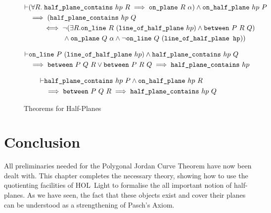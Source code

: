 \begin{figure}
  \begin{equation}\label{eq:onHalfPlaneNotBet}
    \begin{split}
      \vdash&(\forall R.\; \texttt{half\_plane\_contains}\ hp\ R \implies \texttt{on\_plane}\ R\ \alpha) \wedge \texttt{on\_half\_plane}\ hp\ P\\
      &\implies (\texttt{half\_plane\_contains}\ hp\ Q\\
      &\qquad \iff \neg(\exists R. \texttt{on\_line}\ R\ (\texttt{line\_of\_half\_plane}\ hp) \wedge \texttt{between}\ P\ R\ Q)\\
      &\qquad\qquad\quad \wedge \texttt{on\_plane}\ Q\ \alpha \wedge \neg\texttt{on\_line}\ Q\ (\texttt{line\_of\_half\_plane hp}))
    \end{split}
  \end{equation}
  
  \begin{equation}\label{eq:betOnHalfPlane1}
    \begin{split}
      \vdash&\texttt{on\_line}\ P\ (\texttt{line\_of\_half\_plane}\ hp) \wedge \texttt{half\_plane\_contains}\ hp\ Q\\
      &\implies \texttt{between}\ P\ Q\ R \vee \texttt{between}\ P\ R\ Q \implies \texttt{half\_plane\_contains}\ hp
    \end{split}
  \end{equation}
  
  \begin{equation}\label{eq:betOnHalfPlane2}
    \begin{split}
      \vdash&\texttt{half\_plane\_contains}\ hp\ P \wedge \texttt{on\_half\_plane}\ hp\ R\\
      &\implies \texttt{between}\ P\ Q\ R \implies \texttt{half\_plane\_contains}\ hp\ Q
    \end{split}
  \end{equation}
\caption{Theorems for Half-Planes}
\label{fig:HalfPlanesAdditional}
\end{figure}
\section{Conclusion}
All preliminaries needed for the Polygonal Jordan Curve Theorem have now been dealt with. This chapter completes the necessary theory, showing how to use the quotienting facilities of HOL~Light to formalise the all important notion of half-planes. As we have seen, the fact that these objects exist and cover their planes can be understood as a strengthening of Pasch's Axiom.

